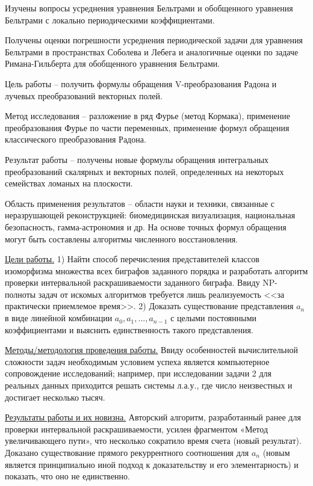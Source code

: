 

Изучены вопросы усреднения уравнения Бельтрами и обобщенного уравнения Бельтрами с локально периодическими коэффициентами.

Получены оценки погрешности усреднения периодической задачи для уравнения Бельтрами в пространствах Соболева и Лебега и аналогичные оценки по задаче Римана-Гильберта для обобщенного уравнения Бельтрами.


Цель работы  -- получить формулы обращения V-преобразования Радона и лучевых преобразований векторных полей.

Метод исследования -- разложение в ряд Фурье (метод Кормака), применение преобразования Фурье по части переменных, применение формул обращения классического преобразования Радона.

Результат работы -- получены новые формулы обращения интегральных преобразований скалярных и векторных полей, определенных на некоторых семействах ломаных на плоскости.

Область применения результатов -- области науки и техники, связанные с неразрушающей реконструкцией: биомедицинская визуализация, национальная безопасность, гамма-астрономия и др. На основе точных формул обращения могут быть составлены алгоритмы численного восстановления.



\underline{Цели работы.}
1) Найти способ перечисления представителей классов изоморфизма множества всех биграфов заданного порядка и разработать алгоритм проверки интервальной раскрашиваемости заданного биграфа. Ввиду NP-полноты задач от искомых алгоритмов требуется лишь реализуемость <<за практически приемлемое время>>. 2) Доказать существование представления $a_n$ в виде линейной комбинации $a_0, a_1, ..., a_{n-1}$ с целыми постоянными коэффициентами и выяснить единственность такого представления.

\underline{Методы/методология проведения работы.}
 Ввиду особенностей вычислительной сложности задач необходимым условием успеха является компьютерное сопровождение исследований; например, при исследовании задачи 2 для реальных данных приходится решать системы л.а.у., где число неизвестных и достигает несколько тысяч.

\underline{Результаты работы и их новизна.}
Авторский алгоритм, разработанный ранее для проверки интервальной раскрашиваемости, усилен фрагментом «Метод увеличивающего пути», что несколько сократило время счета (новый результат). Доказано существование прямого рекуррентного соотношения для $a_n$ (новым является принципиально иной подход к доказательству и его элементарность) и показать, что оно не единственно.

